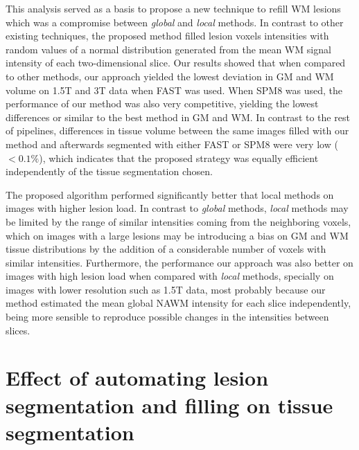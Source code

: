 This analysis served as a basis to propose a new technique to refill WM lesions which was a compromise between \textit{global} and \textit{local} methods. In contrast to other existing techniques, the proposed method filled lesion voxels intensities with random values of a normal distribution generated from the mean WM signal intensity of each two-dimensional slice. Our results showed that when compared to other methods, our approach yielded the lowest deviation in GM and WM volume on 1.5T and 3T data when FAST was used. When SPM8 was used, the performance of our method was also very competitive, yielding the lowest differences or similar to the best method in GM and WM. 
In contrast to the rest of pipelines, differences in tissue volume between the same images filled with our method and afterwards segmented with either FAST or SPM8 were very low ($<0.1\%$), which indicates that the proposed strategy was equally efficient independently of the tissue segmentation chosen.

The proposed algorithm performed significantly better that local methods on images with higher lesion load. In contrast to \textit{global} methods, \textit{local} methods may be limited by the range of similar intensities coming from the neighboring voxels, which on images with a large lesions may be introducing a bias on GM and WM tissue distributions by the addition of a considerable number of voxels with similar intensities. Furthermore, the performance our approach was also better on images with high lesion load when compared with \textit{local} methods, specially on images with lower resolution such as 1.5T data, most probably because our method estimated the mean global NAWM intensity for each slice independently, being more sensible to reproduce possible changes in the intensities between slices.


\section{Effect of automating lesion segmentation and filling on  tissue segmentation}
\label{sec:label}


